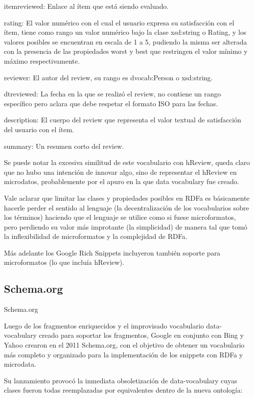 itemreviewed: Enlace al ítem que está siendo evaluado.

rating: El valor numérico con el cual el usuario expresa su satisfacción con el ítem, tiene como rango un valor numérico bajo la clase 
xsd:string o Rating, y los valores posibles se encuentran en escala de 1 a 5, pudiendo la misma ser alterada con la presencia de las 
propiedades worst y best que restringen el valor mínimo y máximo respectivamente.

reviewer: El autor del review, su rango es dvocab:Person o xsd:string.

dtreviewed: La fecha en la que se realizó el review, no contiene un rango específico pero aclara que debe respetar el formato 
ISO para las fechas.

description: El cuerpo del review que representa el valor textual de satisfacción del usuario con el ítem.

summary: Un resumen corto del review.

Se puede notar la excesiva similitud de este vocabulario con hReview, queda claro que no hubo una intención de innovar algo, 
sino de representar el hReview en microdatos, probablemente por el apuro en la que data vocabulary fue creado.

Vale aclarar que limitar las clases y propiedades posibles en RDFa es básicamente hacerle perder el sentido al lenguaje 
(la decentralización de los vocabularios sobre los términos) haciendo que el lenguaje se utilice como si fuese microformatos, 
pero perdiendo su valor más improtante (la simplicidad) de manera tal que tomó la inflexibilidad de microformatos y la complejidad 
de RDFa.

Más adelante los Google Rich Snippets incluyeron también soporte para microformatos (lo que incluía hReview). 


\subsection{Schema.org}
Schema.org

Luego de los fragmentos enriquecidos y el improvisado vocabulario data-vocabulary creado para soportar los fragmentos, Google 
en conjunto con Bing y Yahoo crearon en el 2011 Schema.org, con el objetivo de obtener un vocabulario más completo y 
organizado para la implementación de los snippets con RDFa y microdata.

Su lanzamiento provocó la inmediata obsoletización de data-vocabulary cuyas clases fueron todas reemplazadas por equivalentes 
dentro de la nueva ontología:

